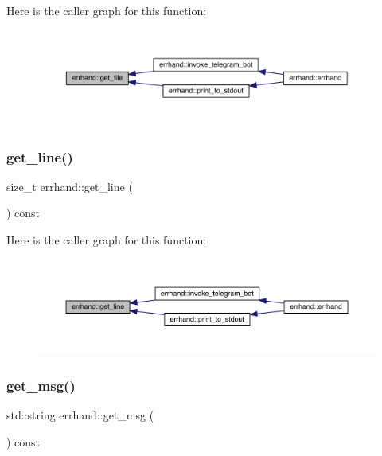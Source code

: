 Here is the caller graph for this function\+:\nopagebreak
\begin{figure}[H]
\begin{center}
\leavevmode
\includegraphics[width=350pt]{classerrhand_a1556ee8d0aaefeea3bbab73f7ae50914_icgraph}
\end{center}
\end{figure}
\mbox{\label{classerrhand_a258f97d84476b21efc38827cda3e5889}} 
\subsubsection{\texorpdfstring{get\+\_\+line()}{get\_line()}}
{\footnotesize\ttfamily size\+\_\+t errhand\+::get\+\_\+line (\begin{DoxyParamCaption}{ }\end{DoxyParamCaption}) const\hspace{0.3cm}{\ttfamily [inline]}}

Here is the caller graph for this function\+:\nopagebreak
\begin{figure}[H]
\begin{center}
\leavevmode
\includegraphics[width=350pt]{classerrhand_a258f97d84476b21efc38827cda3e5889_icgraph}
\end{center}
\end{figure}
\mbox{\label{classerrhand_a524dfc6821f703329d8801dd3298f33f}} 
\subsubsection{\texorpdfstring{get\+\_\+msg()}{get\_msg()}}
{\footnotesize\ttfamily std\+::string errhand\+::get\+\_\+msg (\begin{DoxyParamCaption}{ }\end{DoxyParamCaption}) const\hspace{0.3cm}{\ttfamily [inline]}}

